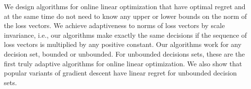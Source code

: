 We design algorithms for online linear optimization that have optimal regret
and at the same time do not need to know any upper or lower bounds on the norm
of the loss vectors.  We achieve adaptiveness to norms of loss vectors by scale
invariance, i.e., our algorithms make exactly the same decisions if the
sequence of loss vectors is multiplied by any positive constant.  Our
algorithms work for any decision set, bounded or unbounded.  For unbounded
decisions sets, these are the first truly adaptive algorithms for online linear
optimization. We also show that popular variants of gradient descent have
linear regret for unbounded decision sets.

